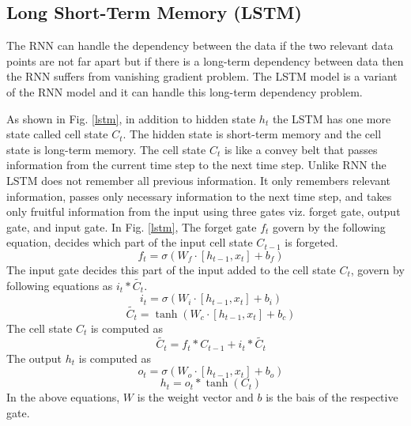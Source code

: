 \documentclass{ws-ijait}
\begin{document}
\subsection{Long Short-Term Memory (LSTM)}
The RNN can handle the dependency between the data if the two relevant data points are not far apart but if there is a long-term dependency between data then the RNN suffers from vanishing gradient problem. The LSTM model is a variant of the RNN model and it can handle this long-term dependency problem.
\par As shown in Fig. \ref{lstm}, in addition to hidden state $h_t$ the LSTM has one more state called cell state $C_t$. The hidden state is short-term memory and the cell state is long-term memory. The cell state $C_t$ is like a convey belt that passes information from the current time step to the next time step. Unlike RNN the LSTM does not remember all previous information. It only remembers relevant information, passes only necessary information to the next time step, and takes only fruitful information from the input using three gates viz. forget gate, output gate, and input gate. In Fig. \ref{lstm}, The forget gate $f_t$ govern by the following equation, decides which part of the input cell state $C_{t-1}$ is forgeted.
\begin{equation}
	\quad f_t = \sigma(W_{f} \cdot [h_{t-1},x_t] + b_{f})
\end{equation}
The input gate decides this part of the input added to the cell state $C_{t}$, govern by following equations as $i_t\ast \tilde{C_t}$.
\begin{equation}
	\quad i_t = \sigma(W_{i} \cdot [h_{t-1},x_t] + b_{i})
\end{equation}
\begin{equation}
	\quad \tilde{C_t}= \tanh(W_{c} \cdot [h_{t-1},x_t] + b_{c})
\end{equation}
The cell state ${C_t}$ is computed as 
\begin{equation}
	\quad \tilde{C_t}= f_t\ast {C_{t-1}} + i_t\ast \tilde{C_t}
\end{equation}
The output $h_t$ is computed as
\begin{equation}
	\quad {o_t}= \sigma(W_{o} \cdot [h_{t-1},x_t] + b_{o})
\end{equation}
\begin{equation}
	\quad {h_t}= {o_t}\ast  \tanh(C_t)
\end{equation}
In the above equations, $W$ is the weight vector and $b$ is the bais of the respective gate.
\end{document}

